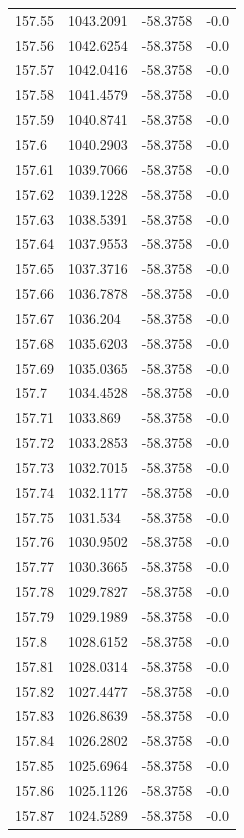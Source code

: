 \begin{table}[H]
\begin{tabular}{llll}
157.55 & 1043.2091 & -58.3758 & -0.0 \\
157.56 & 1042.6254 & -58.3758 & -0.0 \\
157.57 & 1042.0416 & -58.3758 & -0.0 \\
157.58 & 1041.4579 & -58.3758 & -0.0 \\
157.59 & 1040.8741 & -58.3758 & -0.0 \\
157.6 & 1040.2903 & -58.3758 & -0.0 \\
157.61 & 1039.7066 & -58.3758 & -0.0 \\
157.62 & 1039.1228 & -58.3758 & -0.0 \\
157.63 & 1038.5391 & -58.3758 & -0.0 \\
157.64 & 1037.9553 & -58.3758 & -0.0 \\
157.65 & 1037.3716 & -58.3758 & -0.0 \\
157.66 & 1036.7878 & -58.3758 & -0.0 \\
157.67 & 1036.204 & -58.3758 & -0.0 \\
157.68 & 1035.6203 & -58.3758 & -0.0 \\
157.69 & 1035.0365 & -58.3758 & -0.0 \\
157.7 & 1034.4528 & -58.3758 & -0.0 \\
157.71 & 1033.869 & -58.3758 & -0.0 \\
157.72 & 1033.2853 & -58.3758 & -0.0 \\
157.73 & 1032.7015 & -58.3758 & -0.0 \\
157.74 & 1032.1177 & -58.3758 & -0.0 \\
157.75 & 1031.534 & -58.3758 & -0.0 \\
157.76 & 1030.9502 & -58.3758 & -0.0 \\
157.77 & 1030.3665 & -58.3758 & -0.0 \\
157.78 & 1029.7827 & -58.3758 & -0.0 \\
157.79 & 1029.1989 & -58.3758 & -0.0 \\
157.8 & 1028.6152 & -58.3758 & -0.0 \\
157.81 & 1028.0314 & -58.3758 & -0.0 \\
157.82 & 1027.4477 & -58.3758 & -0.0 \\
157.83 & 1026.8639 & -58.3758 & -0.0 \\
157.84 & 1026.2802 & -58.3758 & -0.0 \\
157.85 & 1025.6964 & -58.3758 & -0.0 \\
157.86 & 1025.1126 & -58.3758 & -0.0 \\
157.87 & 1024.5289 & -58.3758 & -0.0 \\

\end{tabular}
\end{table}
